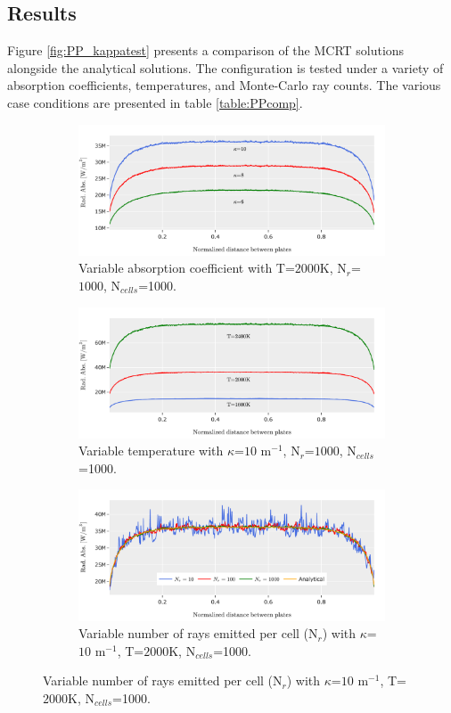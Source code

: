 \subsection{Results}
Figure \ref{fig:PP_kappatest} presents a comparison of the MCRT solutions alongside the analytical solutions. The configuration is tested under a variety of absorption coefficients, temperatures, and Monte-Carlo ray counts. The various case conditions are presented in table \ref{table:PPcomp}.

\begin{figure}
  \begin{subfigure}{1\textwidth}
  \includegraphics[width=\linewidth]{figures/ch4/PPcomparison1.png}
  \caption{Variable absorption coefficient with T=$2000$K, N$_r$=$1000$, N$_{cells}$=1000.}
  \label{fig:PPcomp_kappa}
  \end{subfigure}
  \begin{subfigure}{1\textwidth}
  \includegraphics[width=\linewidth]{figures/ch4/PPcomparison2.png}
  \caption{Variable temperature with $\kappa{}$=$10$ m$^{-1}$, N$_r$=$1000$, N$_{cells}$=1000.}
  \label{fig:PPcomp_temp}
  \end{subfigure}
  \begin{subfigure}{1\textwidth}
  \includegraphics[width=\linewidth]{figures/ch4/PPcomparison3.png}
  \caption{Variable number of rays emitted per cell (N$_r$) with $\kappa{}$=$10$ m$^{-1}$, T=$2000$K, N$_{cells}$=1000.}
  \label{fig:PPcom_nrays}
  \end{subfigure}
  \label{fig:PPcomp}
\end{figure}

